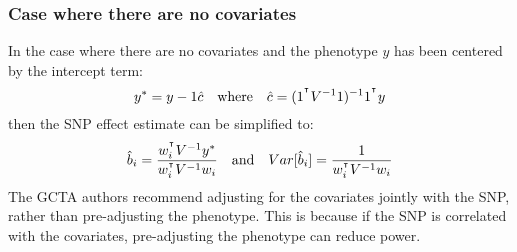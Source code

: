 \documentclass[12pt]{article}
\begin{document}
\subsubsection{Case where there are no covariates}
In the case where there are no covariates and the phenotype $y$ has been centered by the intercept term:
\begin{equation*}
    y^* = y - 1 \hat{c}
    \quad\mathrm{where}\quad
    \hat{c} = (1^{^\intercal} V^{-1} 1)^{-1} 1^{^\intercal} y
\end{equation*}
then the SNP effect estimate can be simplified to:
\begin{equation*}
    \hat{b}_i = \frac{w_i^{^\intercal} V^{-1} y^*}{w_i^{^\intercal} V^{-1} w_i}
    \quad\mathrm{and}\quad
    Var[\hat{b}_i] = \frac{1}{w_i^{^\intercal} V^{-1} w_i}
\end{equation*}
The GCTA authors recommend adjusting for the covariates jointly with the SNP, rather than pre-adjusting the phenotype.
This is because if the SNP is correlated with the covariates, pre-adjusting the phenotype can reduce power.
\end{document}
